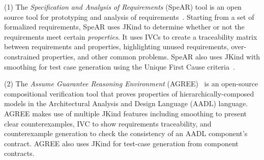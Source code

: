 \documentclass{llncs}
\newcommand{\jkind}{{\sc JKind}\xspace}
\newcommand{\lustre}{{\sc Lustre}\xspace}
\newcommand{\spear}{{\sc SpeAR}\xspace}
\newcommand{\agree}{{\sc AGREE}\xspace}
\renewcommand{\paragraph}[1]{\vspace{5pt}\noindent {\bf #1}}
\newcommand{\application}[2]{
  \paragraph{#1} \hfill {\it #2}
  \vspace{1pt}
}
\begin{document}
(1) The {\em Specification and Analysis of Requirements} (\spear) tool is an open source tool for prototyping and analysis of requirements~\cite{fifarek2017nfm}.  Starting from a set of formalized requirements, \spear uses \jkind to determine whether or not the requirements meet certain {\em properties}.  It uses IVCs to create a traceability matrix between requirements and properties, highlighting unused requirements, over-constrained properties, and other common problems. \spear also uses \jkind with smoothing for test case generation using the Unique First Cause criteria~\cite{whalen2006issta}.
%
%

(2) The {\em Assume Guarantee Reasoning Environment} (\agree)~\cite{cofer2012nfm,QFCS15:backes,hilt2013} is an open-source compositional verification tool that proves properties of hierarchically-composed models in the Architectural Analysis and Design Language (AADL) language.  %
%
%
%
\agree makes use of multiple \jkind features including smoothing to
present clear counterexamples, IVC to show requirements traceability,
and counterexample generation to check the consistency of an AADL
component's contract. \agree also uses \jkind for test-case generation
from component contracts.
\end{document}
